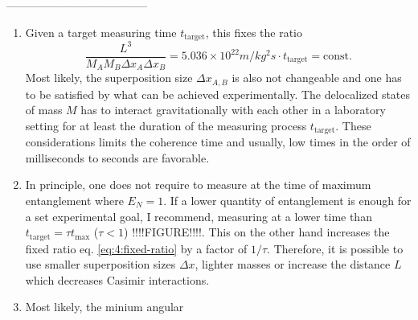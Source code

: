 -------------------------------------- 

\begin{enumerate}
  \item Given a target measuring time $t_\mathrm{target}$, this fixes the ratio
  \begin{equation}\label{eq:4:fixed-ratio}
    \frac{L^3}{M_A M_B \Delta x_A \Delta x_B} = 5.036\times 10^{22}\si{m/kg^2s} \cdot t_\mathrm{target} = \mathrm{const.}
  \end{equation}
  Most likely, the superposition size $\Delta x_{A,B}$ is also not changeable and one has to be satisfied by what can be achieved experimentally. The delocalized states of mass $M$ has to interact gravitationally with each other in a laboratory setting for at least the duration of the measuring process $t_\mathrm{target}$. These considerations limits the coherence time and usually, low times in the order of milliseconds to seconds are favorable.
  \item In principle, one does not require to measure at the time of maximum entanglement where $E_N = 1$. If a lower quantity of entanglement is enough for a set experimental goal, I recommend, measuring at a lower time than $t_\mathrm{target} = \tau t_\mathrm{max}$ ($\tau < 1$) !!!!FIGURE!!!!. This on the other hand increases the fixed ratio eq. \eqref{eq:4:fixed-ratio} by a factor of $1/\tau$.
  Therefore, it is possible to use smaller superposition sizes $\Delta x$, lighter masses or increase the distance $L$ which decreases Casimir interactions.
  \item Most likely, the minium angular 
\end{enumerate}